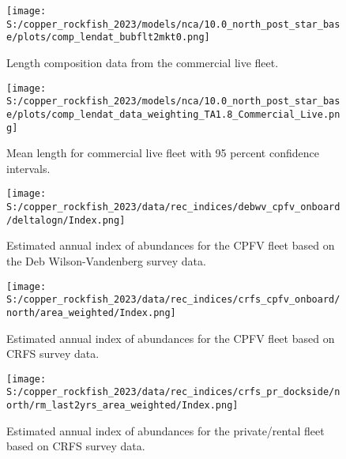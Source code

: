 \documentclass[11pt,
  letterpaper,
]{article}
\begin{document}
\begin{figure}
{\centering
\texttt{[image: S:/copper\_rockfish\_2023/models/nca/10.0\_north\_post\_star\_base/plots/comp\_lendat\_bubflt2mkt0.png]}
}
\caption{Length composition data from the commercial live fleet.\label{fig:com-live-len-data}}
\end{figure}

\begin{figure}
{\centering
\texttt{[image: S:/copper\_rockfish\_2023/models/nca/10.0\_north\_post\_star\_base/plots/comp\_lendat\_data\_weighting\_TA1.8\_Commercial\_Live.png]}
}
\caption{Mean length for commercial live fleet with 95 percent confidence intervals.\label{fig:mean-com-live-len-data}}
\end{figure}

\pagebreak

\begin{figure}
{\centering
\texttt{[image: S:/copper\_rockfish\_2023/data/rec\_indices/debwv\_cpfv\_onboard/deltalogn/Index.png]}
}
\caption{Estimated annual index of abundances for the CPFV fleet based on the Deb Wilson-Vandenberg survey data.\label{fig:dwv-index-main}}
\end{figure}

\pagebreak

\begin{figure}
{\centering
\texttt{[image: S:/copper\_rockfish\_2023/data/rec\_indices/crfs\_cpfv\_onboard/north/area\_weighted/Index.png]}
}
\caption{Estimated annual index of abundances for the CPFV fleet based on CRFS survey data.\label{fig:crfs-index-main}}
\end{figure}

\pagebreak

\begin{figure}
{\centering
\texttt{[image: S:/copper\_rockfish\_2023/data/rec\_indices/crfs\_pr\_dockside/north/rm\_last2yrs\_area\_weighted/Index.png]}
}
\caption{Estimated annual index of abundances for the private/rental fleet based on CRFS survey data.\label{fig:crfs-pr-index-main}}
\end{figure}
\end{document}
